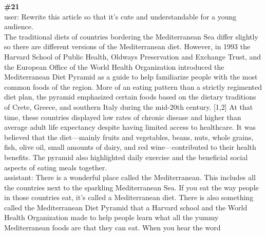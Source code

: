 \documentclass[10pt]{article}
\begin{document}
\begin{Form}
\vspace{-1pt}
\CheckBox[name=q20c,width=1.6ex,height=1.6ex,bordercolor={0.45 0.45 0.45}]{~\textcolor{cbox}{COMPACT}}\quad
\CheckBox[name=q20d,width=1.6ex,height=1.6ex,bordercolor={0.45 0.45 0.45}]{~\textcolor{dbox}{DIFFUSE}}\quad
\CheckBox[name=q20n,width=1.6ex,height=1.6ex,bordercolor={0.45 0.45 0.45}]{~\textcolor{nbox}{NONE}}
\vspace{8pt}
\begin{tcolorbox}[colback=convbg,colframe=itemframe,boxrule=0.8pt,arc=2pt,breakable,left=6pt,right=6pt,top=5pt,bottom=5pt]
{\footnotesize\textbf{\#21}}\\[3pt]
{\footnotesize user: Rewrite this article so that it's cute and understandable for a young audience. \\[2pt]
The traditional diets of countries bordering the Mediterranean Sea differ slightly so there are different versions of the Mediterranean diet. However, in 1993 the Harvard School of Public Health, Oldways Preservation and Exchange Trust, and the European Office of the World Health Organization introduced the Mediterranean Diet Pyramid as a guide to help familiarize people with the most common foods of the region. More of an eating pattern than a strictly regimented diet plan, the pyramid emphasized certain foods based on the dietary traditions of Crete, Greece, and southern Italy during the mid-20th century. [1,2] At that time, these countries displayed low rates of chronic disease and higher than average adult life expectancy despite having limited access to healthcare. It was believed that the diet—mainly fruits and vegetables, beans, nuts, whole grains, ﬁsh, olive oil, small amounts of dairy, and red wine—contributed to their health benefits. The pyramid also highlighted daily exercise and the beneficial social aspects of eating meals together. \\[2pt]
assistant: There is a wonderful place called the Mediterranean. This includes all the countries next to the sparkling Mediterranean Sea. If you eat the way people in those countries eat, it's called a Mediterranean diet. There is also something called the Mediterranean Diet Pyramid that a Harvard school and the World Health Organization made to help people learn what all the yummy Mediterranean foods are that they can eat. When you hear the word}
\end{tcolorbox}
\vspace{-1pt}
\CheckBox[name=q21c,width=1.6ex,height=1.6ex,bordercolor={0.45 0.45 0.45}]{~\textcolor{cbox}{COMPACT}}\quad
\CheckBox[name=q21d,width=1.6ex,height=1.6ex,bordercolor={0.45 0.45 0.45}]{~\textcolor{dbox}{DIFFUSE}}\quad

\end{Form}
\end{document}
